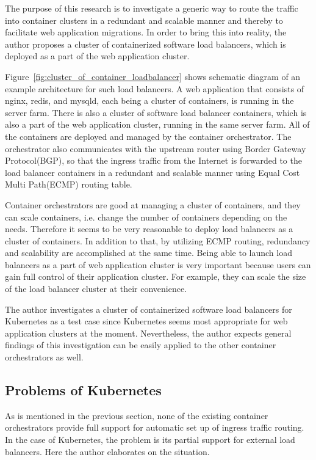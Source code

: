 The purpose of this research is to investigate a generic way to route the traffic into container clusters in a redundant and scalable manner and thereby to facilitate web application migrations.
In order to bring this into reality, the author proposes a cluster of containerized software load balancers, which is deployed as a part of the web application cluster.

Figure~\ref{fig:cluster_of_container_loadbalancer} shows schematic diagram of an example architecture for such load balancers.
A web application that consists of nginx, redis, and mysqld, each being a cluster of containers, is running in the server farm.
There is also a cluster of software load balancer containers, which is also a part of the web application cluster, running in the same server farm. 
All of the containers are deployed and managed by the container orchestrator.
The orchestrator also communicates with the upstream router using Border Gateway Protocol(BGP), so that the ingress traffic from the Internet is forwarded to the load balancer containers in a redundant and scalable manner using Equal Cost Multi Path(ECMP)\cite{rfc7911} routing table.

Container orchestrators are good at managing a cluster of containers, and they can scale containers, i.e. change the number of containers depending on the needs.
Therefore it seems to be very reasonable to deploy load balancers as a cluster of containers.
In addition to that, by utilizing ECMP routing, redundancy and scalability are accomplished at the same time.
Being able to launch load balancers as a part of web application cluster is very important because users can gain full control of their application cluster.
For example, they can scale the size of the load balancer cluster at their convenience.

The author investigates a cluster of containerized software load balancers for Kubernetes as a test case since Kubernetes seems most appropriate for web application clusters at the moment.
Nevertheless, the author expects general findings of this investigation can be easily applied to the other container orchestrators as well.

\subsection{Problems of Kubernetes}

As is mentioned in the previous section, none of the existing container orchestrators provide full support for automatic set up of ingress traffic routing.
In the case of Kubernetes, the problem is its partial support for external load balancers.
Here the author elaborates on the situation.

